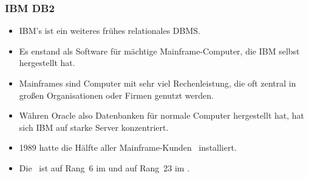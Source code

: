 \documentclass[aspectratio=169,mathserif,notheorems]{beamer}%
\begin{document}
%
\begin{frame}%
\frametitle{IBM DB2}%
\begin{itemize}%
\item IBM's \ibmDB\cite{CWDS2007UDLVWE,BBBCCDMMP2016SPTAFOIDFI} ist ein weiteres frühes relationales DBMS\cite{HS2013THAGOID}.%
\item<2-> Es enstand als Software für mächtige Mainframe-Computer, die IBM selbst hergestellt hat.%
\item<3-> Mainframes sind Computer mit sehr viel Rechenleistung, die oft zentral in großen Organisationen oder Firmen genutzt werden.%
\item<4-> Währen Oracle also Datenbanken für normale Computer hergestellt hat, hat sich IBM auf starke Server konzentriert.%
\item<5-> 1989 hatte die Hälfte aller Mainframe-Kunden \ibmDB\ installiert\cite{HS2013THAGOID}.%
\item<6-> Die \ibmDB\ ist auf Rang~6 im \cite{RS2025DERORD} und auf Rang~23 im \cite{SE:SO:2024DS}.%
\end{itemize}%
\end{frame}%
%
\end{document}

